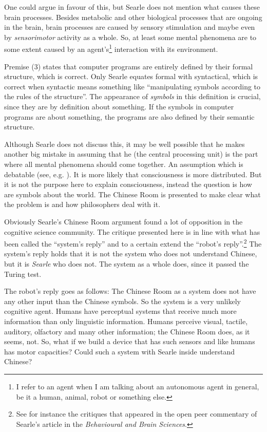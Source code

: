 One could argue in favour of this, but Searle does not mention what causes these brain processes. Besides metabolic and other biological processes that are ongoing in the brain, brain processes are caused by sensory stimulation and maybe even by {\em sensorimotor} activity as a whole. So, at least some mental phenomena are to some extent caused by an agent's\footnote{I refer to an agent when I am talking about an autonomous agent in general, be it a human, animal, robot or something else.} interaction with its environment.

Premise (3) states that computer programs are entirely defined by their formal structure, which is correct. Only Searle equates formal with syntactical, which is correct when syntactic means something like ``manipulating symbols according to the rules of the structure''. The appearance of {\em symbols} in this definition is crucial, since they are by definition about something. If the symbols in computer programs are about something, the programs are also defined by their semantic structure.

Although Searle does not discuss this, it may be well possible that he makes another big mistake in assuming that he (the central processing unit) is the part where all mental phenomena should come together. An assumption which is debatable (see, e.g. \citealt{dennett:1991,edelman:1992}). It is more likely that consciousness is more distributed. But it is not the purpose here to explain consciousness, instead the question is how are symbols about the world. The Chinese Room is presented to make clear what the problem is and how philosophers deal with it.

Obviously Searle's Chinese Room argument found a lot of opposition in the cognitive science community. The critique presented here is in line with what has been called the ``system's reply'' and to a certain extend the ``robot's reply''.\footnote{See for instance the critiques that appeared in the open peer commentary of Searle's \citeyear{searle:1980} article in the {\it Behavioural and Brain Sciences}.} The system's reply holds that it is not the system who does not understand Chinese, but it is {\em Searle} who does not. The system as a whole does, since it passed the Turing test. 

The robot's reply goes as follows: The Chinese Room as a system does not have any other input than the Chinese symbols. So the system is a very unlikely cognitive agent. Humans have perceptual systems that receive much more information than only linguistic information. Humans perceive visual, tactile, auditory, olfactory and many other information; the Chinese Room does, as it seems, not. So, what if we build a device that has such sensors and like humans has motor capacities? Could such a system with Searle inside understand Chinese?

